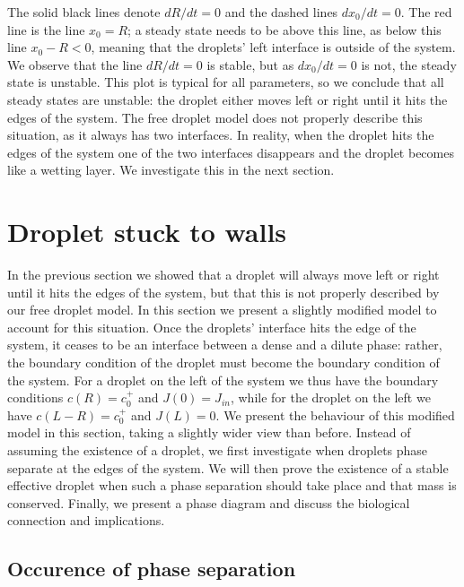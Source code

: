 \documentclass{Dissertate}
\begin{document}
The solid black lines denote \(dR/dt=0\) and the dashed lines
\(dx_0/dt=0\). The red line is the line \(x_0=R\); a steady state needs
to be above this line, as below this line \(x_0-R<0\), meaning that the
droplets' left interface is outside of the system. We observe that the
line \(dR/dt=0\) is stable, but as \(dx_0/dt=0\) is not, the steady
state is unstable. This plot is typical for all parameters, so we
conclude that all steady states are unstable: the droplet either moves
left or right until it hits the edges of the system. The free droplet
model does not properly describe this situation, as it always has two
interfaces. In reality, when the droplet hits the edges of the system
one of the two interfaces disappears and the droplet becomes like a
wetting layer. We investigate this in the next section.

\hypertarget{droplet-stuck-to-walls}{%
\section{Droplet stuck to walls}\label{droplet-stuck-to-walls}}

In the previous section we showed that a droplet will always move left
or right until it hits the edges of the system, but that this is not properly described by our free droplet model. In this section we
present a slightly modified model to account for this situation. Once the
droplets' interface hits the edge of the system, it ceases to be an
interface between a dense and a dilute phase: rather, the boundary
condition of the droplet must become the boundary condition of the
system. For a droplet on the left of the system we thus have the
boundary conditions \(c(R)=c_0^+\) and \(J(0)=J_{in}\), while for the
droplet on the left we have \(c(L-R)=c_0^+\) and \(J(L)=0\). We present
the behaviour of this modified model in this section, taking a slightly
wider view than before. Instead of assuming the existence of a droplet,
we first investigate when droplets phase separate at the edges of the
system. We will then prove the existence of a stable effective droplet
when such a phase separation should take place and that mass is
conserved. Finally, we present a phase diagram and discuss the
biological connection and implications.

\hypertarget{occurence-of-phase-separation}{%
\subsection{Occurence of phase
separation}\label{occurence-of-phase-separation}}
\end{document}
